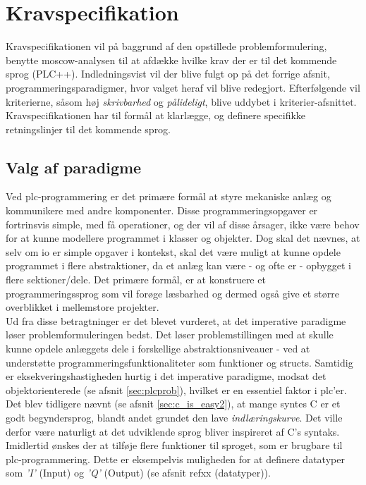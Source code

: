 \section{Kravspecifikation}
Kravspecifikationen vil på baggrund af den opstillede problemformulering, benytte \gls{moscow}-analysen til at afdække hvilke krav der er til det kommende sprog (PLC++). Indledningsvist vil der blive fulgt op på det forrige afsnit, programmeringsparadigmer, hvor valget heraf vil blive redegjort. Efterfølgende vil kriterierne, såsom høj \textit{skrivbarhed} og \textit{pålideligt}, blive uddybet i kriterier-afsnittet. Kravspecifikationen har til formål at klarlægge, og definere specifikke retningslinjer til det kommende sprog.

\subsection{Valg af paradigme}\label{ssec:paradigmevalg}
Ved \gls{plc}-programmering er det primære formål at styre mekaniske anlæg og kommunikere med andre komponenter. Disse programmeringsopgaver er fortrinsvis simple, med få operationer, og der vil af disse årsager, ikke være behov for at kunne modellere programmet i klasser og objekter. Dog skal det nævnes, at selv om \gls{io} er simple opgaver i kontekst, skal det være muligt at kunne opdele programmet i flere abstraktioner, da et anlæg kan være - og ofte er - opbygget i flere sektioner/dele. Det primære formål, er at konstruere et programmeringssprog som vil forøge læsbarhed og dermed også give et større overblikket i mellemstore projekter. \\

\noindent Ud fra disse betragtninger er det blevet vurderet, at det imperative paradigme løser problemformuleringen bedst. Det løser problemstillingen med at skulle kunne opdele anlæggets dele i forskellige abstraktionsniveauer - ved at understøtte programmeringsfunktionaliteter som funktioner og structs. Samtidig er eksekveringshastigheden hurtig i det imperative paradigme, modsat det objektorienterede (se afsnit \ref{sec:plcprob}), hvilket er en essentiel faktor i \gls{plc}'er. \\

\noindent Det blev tidligere nævnt (se afsnit \ref{sec:c_is_easy2}), at mange syntes C er et godt begyndersprog, blandt andet grundet den lave \textit{indlæringskurve}. Det ville derfor være naturligt at det udviklende sprog bliver inspireret af C's syntaks. Imidlertid ønskes der at tilføje flere funktioner til sproget, som er brugbare til \gls{plc}-programmering. Dette er eksempelvis muligheden for at definere datatyper som \textit{'I'} (Input) og \textit{'Q'} (Output) (se afsnit refxx (datatyper)). \\


